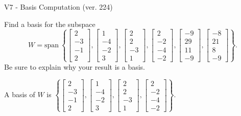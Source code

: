 \begin{exercise}
  \begin{exerciseTitle}V7 - Basis Computation (ver. 224)\end{exerciseTitle}
  \begin{exerciseStatement}
    Find a basis for the subspace 
\[W=\mathrm{span}\ \left\{\left[\begin{array}{r}
2 \\
-3 \\
-1 \\
2
\end{array}\right] , \left[\begin{array}{r}
1 \\
-4 \\
-2 \\
3
\end{array}\right] , \left[\begin{array}{r}
2 \\
2 \\
-3 \\
1
\end{array}\right] , \left[\begin{array}{r}
2 \\
-2 \\
-4 \\
-2
\end{array}\right] , \left[\begin{array}{r}
-9 \\
29 \\
11 \\
-9
\end{array}\right] , \left[\begin{array}{r}
-8 \\
21 \\
8 \\
-9
\end{array}\right]\right\}.\]
 Be sure to explain why your result is a basis.


  \end{exerciseStatement}
  \begin{exerciseAnswer}
   A basis of \(W\) is  \(\left\{\left[\begin{array}{r}
2 \\
-3 \\
-1 \\
2
\end{array}\right] , \left[\begin{array}{r}
1 \\
-4 \\
-2 \\
3
\end{array}\right] , \left[\begin{array}{r}
2 \\
2 \\
-3 \\
1
\end{array}\right] , \left[\begin{array}{r}
2 \\
-2 \\
-4 \\
-2
\end{array}\right]\right\}\).
  


  \end{exerciseAnswer}
\end{exercise}